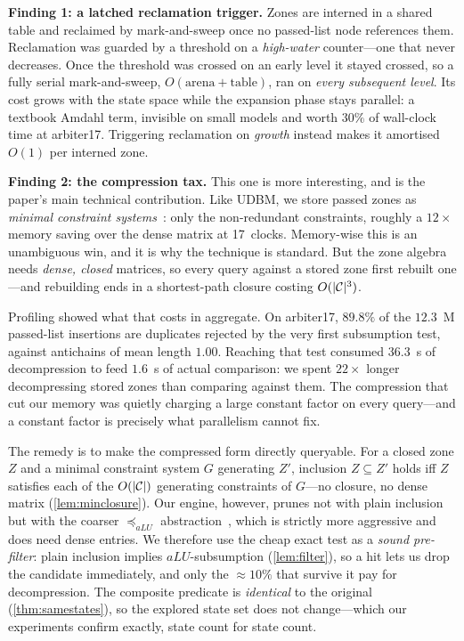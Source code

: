 \medskip
\noindent\textbf{Finding 1: a latched reclamation trigger.}  Zones are interned
in a shared table and reclaimed by mark-and-sweep once no passed-list node
references them.  Reclamation was guarded by a threshold on a \emph{high-water}
counter---one that never decreases.  Once the threshold was crossed on an early
level it stayed crossed, so a fully serial mark-and-sweep, $O(\text{arena} +
\text{table})$, ran on \emph{every subsequent level}.  Its cost grows with the
state space while the expansion phase stays parallel: a textbook Amdahl term,
invisible on small models and worth $30\%$ of wall-clock time at arbiter17.
Triggering reclamation on \emph{growth} instead makes it amortised $O(1)$ per
interned zone.

\medskip
\noindent\textbf{Finding 2: the compression tax.}  This one is more
interesting, and is the paper's main technical contribution.  Like UDBM, we
store passed zones as \emph{minimal constraint systems}~\cite{LarsenLPY97}: only
the non-redundant constraints, roughly a $12\times$ memory saving over the dense
matrix at 17~clocks.  Memory-wise this is an unambiguous win, and it is why the
technique is standard.  But the zone algebra needs \emph{dense, closed}
matrices, so every query against a stored zone first rebuilt one---and
rebuilding ends in a shortest-path closure costing $O(|\mathcal{C}|^3)$.

Profiling showed what that costs in aggregate.  On arbiter17, $89.8\%$ of the
$12.3$~M passed-list insertions are duplicates rejected by the very first
subsumption test, against antichains of mean length $1.00$.  Reaching that test
consumed $36.3$~s of decompression to feed $1.6$~s of actual comparison: we
spent $22\times$ longer decompressing stored zones than comparing against them.
The compression that cut our memory was quietly charging a large constant factor
on every query---and a constant factor is precisely what parallelism cannot fix.

The remedy is to make the compressed form directly queryable.  For a closed zone
$Z$ and a minimal constraint system $G$ generating $Z'$, inclusion $Z \subseteq
Z'$ holds iff $Z$ satisfies each of the $O(|\mathcal{C}|)$ generating constraints of
$G$---no closure, no dense matrix (\cref{lem:minclosure}).  Our engine, however,
prunes not with plain inclusion but with the coarser $\preceq_{aLU}$
abstraction~\cite{Herbreteau12}, which is strictly more aggressive and does need
dense entries.  We therefore use the cheap exact test as a \emph{sound
pre-filter}: plain inclusion implies $aLU$-subsumption (\cref{lem:filter}), so a
hit lets us drop the candidate immediately, and only the $\approx 10\%$ that
survive it pay for decompression.  The composite predicate is \emph{identical}
to the original (\cref{thm:samestates}), so the explored state set does not
change---which our experiments confirm exactly, state count for state count.

